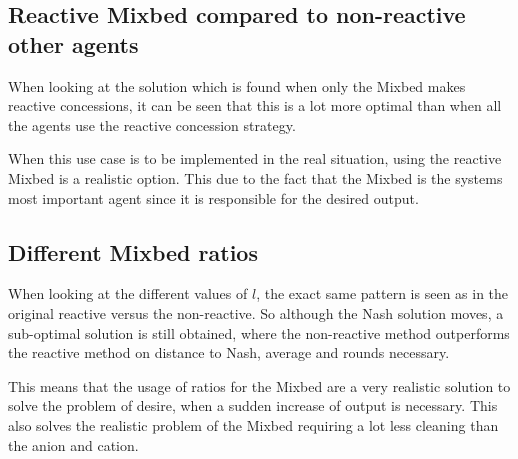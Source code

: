 \subsection{Reactive Mixbed compared to non-reactive other agents}
When looking at the solution which is found when only the Mixbed makes reactive concessions, it can be seen that this is a lot more optimal than when all the agents use the reactive concession strategy. 

When this use case is to be implemented in the real situation, using the reactive Mixbed is a realistic option. This due to the fact that the Mixbed is the systems most important agent since it is responsible for the desired output. 

\subsection{Different Mixbed ratios}
When looking at the different values of $l$, the exact same pattern is seen as in the original reactive versus the non-reactive. So although the Nash solution moves, a sub-optimal solution is still obtained, where the non-reactive method outperforms the reactive method on distance to Nash, average and rounds necessary.

This means that the usage of ratios for the Mixbed are a very realistic solution to solve the problem of desire, when a sudden increase of output is necessary. This also solves the realistic problem of the Mixbed requiring a lot less cleaning than the anion and cation.


